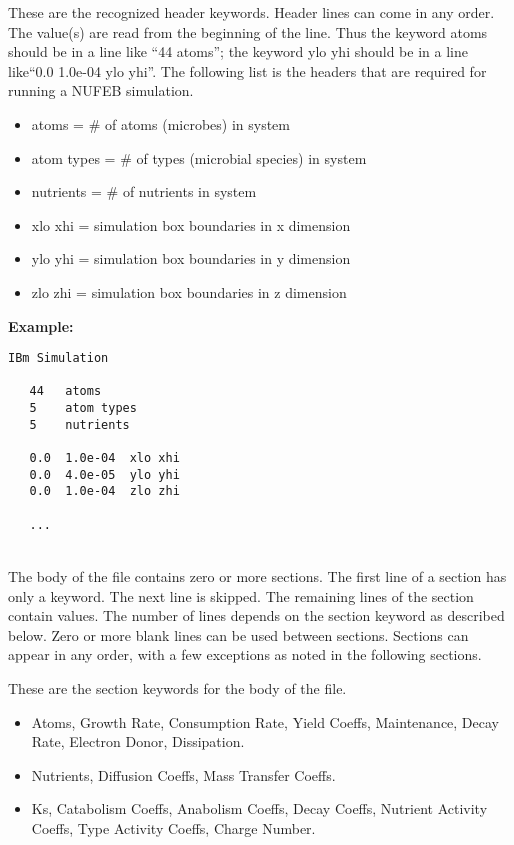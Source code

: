 \documentclass[11pt,a4paper,openright]{article}
\begin{document}
These are the recognized header keywords. Header lines can come in any order. The value(s) are read from the beginning of the line. Thus the keyword atoms should be in a line like ``44 atoms''; the keyword ylo yhi should be in a line like``0.0  1.0e-04 ylo yhi''. The following list is the headers that are required for running a NUFEB simulation. \\

\begin{itemize} [nosep]
    \item atoms = \# of atoms (microbes) in system
    \item atom types = \# of types (microbial species) in system
    \item nutrients = \# of nutrients in system
    \item xlo xhi = simulation box boundaries in x dimension
    \item ylo yhi = simulation box boundaries in y dimension
    \item zlo zhi = simulation box boundaries in z dimension\\
\end{itemize} 

\textbf{Example:}
\begin{Verbatim}[frame=single]
  IBm Simulation 

   44   atoms 
   5    atom types 
   5    nutrients
    
   0.0  1.0e-04  xlo xhi 
   0.0  4.0e-05  ylo yhi 
   0.0  1.0e-04  zlo zhi 
     
   ...
\end{Verbatim}

\\

The body of the file contains zero or more sections. The first line of a section has only a keyword. 
The next line is skipped. The remaining lines of the section contain values. 
The number of lines depends on the section keyword as described below. Zero or more blank lines can be used between sections. Sections can appear in any order, with a few exceptions as noted in the following sections.

These are the section keywords for the body of the file.\\
\begin{itemize} [nosep]
    \item Atoms, Growth Rate, Consumption Rate, Yield Coeffs, Maintenance, Decay Rate, Electron Donor, Dissipation.
    \item Nutrients, Diffusion Coeffs, Mass Transfer Coeffs.
    \item Ks, Catabolism Coeffs, Anabolism Coeffs, Decay Coeffs, Nutrient Activity Coeffs, Type Activity Coeffs,  Charge Number.
\end{itemize} 
\end{document}
